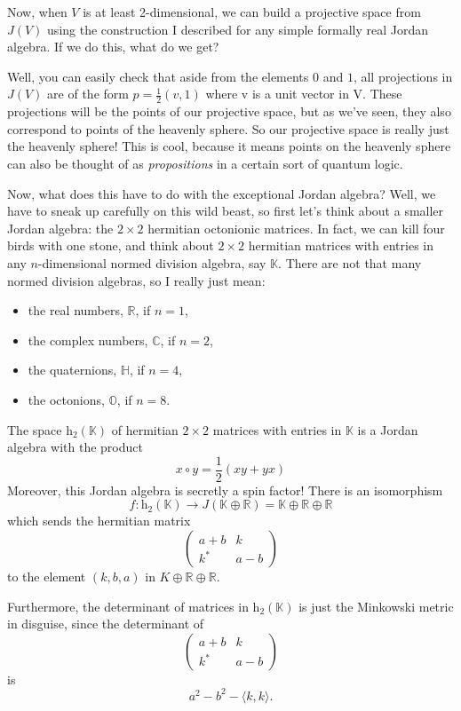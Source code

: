 \documentclass{article}
\def\tightlist{}
\begin{document}
Now, when \(V\) is at least 2-dimensional, we can build a projective
space from \(J(V)\) using the construction I described for any simple
formally real Jordan algebra. If we do this, what do we get?

Well, you can easily check that aside from the elements \(0\) and \(1\),
all projections in \(J(V)\) are of the form \(p = \frac12(v,1)\) where v
is a unit vector in V. These projections will be the points of our
projective space, but as we've seen, they also correspond to points of
the heavenly sphere. So our projective space is really just the heavenly
sphere! This is cool, because it means points on the heavenly sphere can
also be thought of as \emph{propositions} in a certain sort of quantum
logic.

Now, what does this have to do with the exceptional Jordan algebra?
Well, we have to sneak up carefully on this wild beast, so first let's
think about a smaller Jordan algebra: the \(2\times2\) hermitian
octonionic matrices. In fact, we can kill four birds with one stone, and
think about \(2\times2\) hermitian matrices with entries in any
\(n\)-dimensional normed division algebra, say \(\mathbb{K}\). There are
not that many normed division algebras, so I really just mean:

\begin{itemize}
\tightlist
\item
  the real numbers, \(\mathbb{R}\), if \(n = 1\),
\item
  the complex numbers, \(\mathbb{C}\), if \(n = 2\),
\item
  the quaternions, \(\mathbb{H}\), if \(n = 4\),
\item
  the octonions, \(\mathbb{O}\), if \(n = 8\).
\end{itemize}

The space \(\mathrm{h}_2(\mathbb{K})\) of hermitian \(2\times2\)
matrices with entries in \(\mathbb{K}\) is a Jordan algebra with the
product \[x\circ y = \frac12(xy + yx)\] Moreover, this Jordan algebra is
secretly a spin factor! There is an isomorphism
\[f\colon \mathrm{h}_2(\mathbb{K}) \to J(\mathbb{K}\oplus\mathbb{R}) = \mathbb{K}\oplus\mathbb{R}\oplus\mathbb{R}\]
which sends the hermitian matrix \[
  \left(
    \begin{array}{cc}
      a+b&k
    \\k^*&a-b
    \end{array}
  \right)
\] to the element \((k,b,a)\) in \(K\oplus\mathbb{R}\oplus\mathbb{R}\).

Furthermore, the determinant of matrices in \(\mathrm{h}_2(\mathbb{K})\)
is just the Minkowski metric in disguise, since the determinant of \[
  \left(
    \begin{array}{cc}
      a+b&k
    \\k^*&a-b
    \end{array}
  \right)
\] is \[a^2-b^2-\langle k,k\rangle.\]
\end{document}
